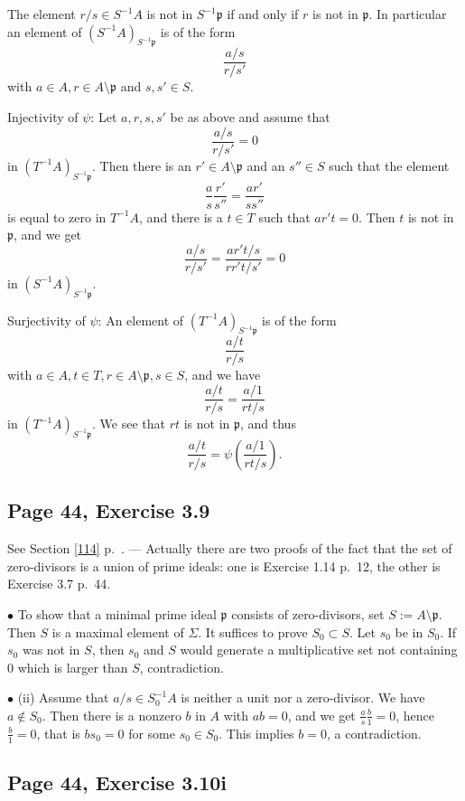 \documentclass[parskip=half,fontsize=12pt]{scrartcl}%
\newcommand{\mf}{\mathfrak}
\newcommand{\ppp}{\mf p}
\newcommand{\bu}{\bullet}
\begin{document}
The element $r/s\in S^{-1}A$ is not in $S^{-1}\ppp$ if and only if $r$ is not in $\ppp$. In particular an element of $(S^{-1}A)_{S^{-1}\ppp}$ is of the form 
$$
\frac{a/s}{r/s'}
$$ 
with $a\in A, r\in A\setminus\ppp$ and $s,s'\in S$.

Injectivity of $\psi$: Let $a,r,s,s'$ be as above and assume that  
$$
\frac{a/s}{r/s'}=0
$$ 
in $(T^{-1}A)_{S^{-1}\ppp}$. Then there is an $r'\in A\setminus\ppp$ and an $s''\in S$ such that the element 
$$
\frac{a}{s}\frac{r'}{s''}=\frac{ar'}{ss''}
$$ 
is equal to zero in $T^{-1}A$, and there is a $t\in T$ such that $ar't=0$. Then $t$ is not in $\ppp$, and we get %
$$
\frac{a/s}{r/s'}=\frac{ar't/s}{rr't/s'}=0
$$ 
in $(S^{-1}A)_{S^{-1}\ppp}$.

Surjectivity of $\psi$: An element of $(T^{-1}A)_{S^{-1}\ppp}$ is of the form 
$$
\frac{a/t}{r/s}
$$ 
with $a\in A,t\in T,r\in A\setminus\ppp, s\in S$, and we have 
$$
\frac{a/t}{r/s}=\frac{a/1}{rt/s}
$$ 
in $(T^{-1}A)_{S^{-1}\ppp}$. We see that $rt$ is not in $\ppp$, and thus 
$$
\frac{a/t}{r/s}=\psi\left(\frac{a/1}{rt/s}\right).
$$

\subsection{Page 44, Exercise 3.9}%

See Section \ref{114} p.~\pageref{114}. --- Actually there are two proofs of the fact that the set of zero-divisors  is a union of prime ideals: one is Exercise 1.14 p.~12, the other is Exercise 3.7 p.~44.

$\bu$ To show that a minimal prime ideal $\ppp$ consists of zero-divisors, set $S:=A\setminus\ppp$. Then $S$ is a maximal element of $\Sigma$. It suffices to prove $S_0\subset S$. Let $s_0$ be in $S_0$. If $s_0$ was not in $S$, then $s_0$ and $S$ would generate a multiplicative set not containing $0$ which is larger than $S$, contradiction. %

$\bu$ (ii) Assume that $a/s\in S_0^{-1}A$ is neither a unit nor a zero-divisor. We have $a\notin S_0$. Then there is a nonzero $b$ in $A$ with $ab=0$, and we get $\frac as\frac b1=0$, hence $\frac b1=0$, that is $bs_0=0$ for some $s_0\in S_0$. This implies $b=0$, a contradiction.

\subsection{Page 44, Exercise 3.10i}%
\end{document}
